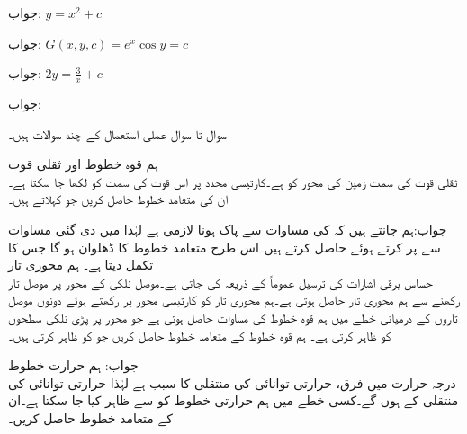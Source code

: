 جواب:
$y=x^2+c$

جواب:
$G(x,y,c)=e^x \cos y=c$

جواب:
$2y=\frac{3}{x}+c$

جواب:

سوال  تا سوال  عملی استعمال کے چند سوالات ہیں۔

 \quad ہم قوہ خطوط اور ثقلی قوت\\
ثقلی قوت کی سمت زمین کی محور کو ہے۔کارتیسی محدد پر اس قوت کی سمت کو  لکھا جا سکتا ہے۔ان کی متعامد خطوط حاصل کریں جو  کہلاتے ہیں۔ 

جواب:ہم جانتے ہیں کہ  کی مساوات  سے پاک ہونا لازمی ہے لہٰذا  میں دی گئی مساوات سے  پر کرتے ہوئے  حاصل کرتے ہیں۔اس طرح متعامد خطوط کا ڈھلوان  ہو گا  جس کا تکمل  دیتا ہے۔  
ہم محوری تار\\
حساس برقی اشارات کی ترسیل عموماً  کے ذریعہ کی جاتی ہے۔موصل نلکی کے محور پر موصل تار رکھنے سے ہم محوری تار حاصل ہوتی ہے۔ہم محوری تار کو کارتیسی محور  پر رکھتے ہوئے  دونوں موصل تاروں کے درمیانی خطے میں ہم قوہ خطوط کی مساوات  حاصل ہوتی ہے جو محور  پر پڑی نلکی سطحوں کو ظاہر کرتی ہے۔ ہم قوہ خطوط کے متعامد خطوط حاصل کریں جو  کو ظاہر کرتی ہیں۔

جواب: 
\quad ہم حرارت خطوط\\
درجہ حرارت میں فرق، حرارتی توانائی کی منتقلی کا سبب ہے لہٰذا  حرارتی توانائی کی منتقلی  کے   ہوں  گے۔کسی خطے میں ہم حرارتی خطوط کو  سے ظاہر کیا جا سکتا ہے۔ان کے متعامد  خطوط حاصل کریں۔


